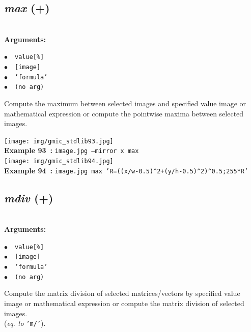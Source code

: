 \documentclass[a4paper,10.5pt,twoside]{book}
\def\comma{\discretionary{,}{}{,}}
\newcommand{\Cb}[1]{\textcolor{cb}{#1}}
\begin{document}
\subsection{\emph{max} (+)}\vspace*{-0.7em}
~\\\textbf{\Cb{Arguments: }}\begin{flushleft}
{\small \Cb{\hspace*{0.5cm}$\bullet$~~\texttt{value[\%]}}}~~~\\
{\small \Cb{\hspace*{0.5cm}$\bullet$~~\texttt{[image]}}}~~~\\
{\small \Cb{\hspace*{0.5cm}$\bullet$~~\texttt{'formula'}}}~~~\\
{\small \Cb{\hspace*{0.5cm}$\bullet$~~\texttt{(no arg)}}}\end{flushleft}
Compute the maximum between selected images and specified value{\comma} image or
mathematical expression{\comma} or compute the pointwise maxima between selected images.
\begin{center}\texttt{[image: img/gmic\_stdlib93.jpg]}\\
{\footnotesize \textbf{Example 93~:} \texttt{image.jpg --mirror x max}}
\\\texttt{[image: img/gmic\_stdlib94.jpg]}\\
{\footnotesize \textbf{Example 94~:} \texttt{image.jpg max 'R=((x/w-0.5)\textasciicircum 2+(y/h-0.5)\textasciicircum 2)\textasciicircum 0.5;255*R'}}
\end{center}

\subsection{\emph{mdiv} (+)}\vspace*{-0.7em}
~\\\textbf{\Cb{Arguments: }}\begin{flushleft}
{\small \Cb{\hspace*{0.5cm}$\bullet$~~\texttt{value[\%]}}}~~~\\
{\small \Cb{\hspace*{0.5cm}$\bullet$~~\texttt{[image]}}}~~~\\
{\small \Cb{\hspace*{0.5cm}$\bullet$~~\texttt{'formula'}}}~~~\\
{\small \Cb{\hspace*{0.5cm}$\bullet$~~\texttt{(no arg)}}}\end{flushleft}
Compute the matrix division of selected matrices/vectors by specified value{\comma} image or
mathematical expression{\comma} or compute the matrix division of selected images.
~\\(\emph{eq. to} {\small \texttt{'m/'}}).
\end{document}
